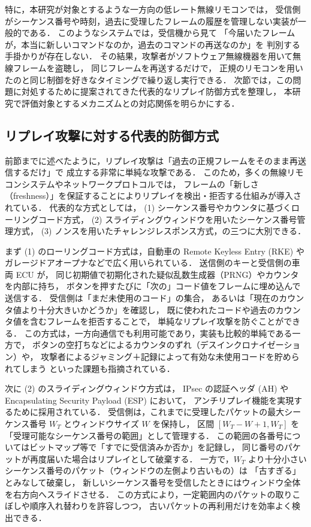 \documentclass[twocolumn,10pt,a4paper]{jsarticle}
\begin{document}
特に，本研究が対象とするような一方向の低レート無線リモコンでは，
受信側がシーケンス番号や時刻，過去に受理したフレームの履歴を管理しない実装が一般的である．
このようなシステムでは，受信機から見て
「今届いたフレームが，本当に新しいコマンドなのか，過去のコマンドの再送なのか」を
判別する手掛かりが存在しない．
その結果，攻撃者がソフトウェア無線機器を用いて無線フレームを盗聴し，
同じフレームを再送するだけで，
正規のリモコンを用いたのと同じ制御を好きなタイミングで繰り返し実行できる．
次節では，この問題に対処するために提案されてきた代表的なリプレイ防御方式を整理し，
本研究で評価対象とするメカニズムとの対応関係を明らかにする．

\subsection{リプレイ攻撃に対する代表的防御方式}

前節までに述べたように，リプレイ攻撃は「過去の正規フレームをそのまま再送信するだけ」で
成立する非常に単純な攻撃である．
このため，多くの無線リモコンシステムやネットワークプロトコルでは，
フレームの「新しさ（freshness）」を保証することによりリプレイを検出・拒否する仕組みが導入されている．
代表的な方式としては，
(1) シーケンス番号やカウンタに基づくローリングコード方式，
(2) スライディングウィンドウを用いたシーケンス番号管理方式，
(3) ノンスを用いたチャレンジレスポンス方式，の三つに大別できる．

まず (1) のローリングコード方式は，自動車の Remote Keyless Entry (RKE) や
ガレージドアオープナなどで広く用いられている\cite{Gesteira2025}．
送信側のキーと受信側の車両 ECU が，
同じ初期値で初期化された疑似乱数生成器（PRNG）やカウンタを内部に持ち，
ボタンを押すたびに「次の」コード値をフレームに埋め込んで送信する．
受信側は「まだ未使用のコード」の集合，
あるいは「現在のカウンタ値より十分大きいかどうか」を確認し，
既に使われたコードや過去のカウンタ値を含むフレームを拒否することで，
単純なリプレイ攻撃を防ぐことができる\cite{Gesteira2025}．
この方式は，一方向通信でも利用可能であり，実装も比較的単純である一方で，
ボタンの空打ちなどによるカウンタのずれ（デスインクロナイゼーション）や，
攻撃者によるジャミング＋記録によって有効な未使用コードを貯められてしまう
といった課題も指摘されている．

次に (2) のスライディングウィンドウ方式は，
IPsec の認証ヘッダ (AH) や Encapsulating Security Payload (ESP) において，
アンチリプレイ機能を実現するために採用されている\cite{rfc6479}．
受信側は，これまでに受理したパケットの最大シーケンス番号 $W_T$ とウィンドウサイズ $W$ を保持し，
区間 $[W_T-W+1, W_T]$ を「受理可能なシーケンス番号の範囲」として管理する．
この範囲の各番号についてはビットマップ等で「すでに受信済みか否か」を記録し，
同じ番号のパケットが再度届いた場合はリプレイとして破棄する\cite{rfc6479}．
一方で，$W_T$ より十分小さいシーケンス番号のパケット（ウィンドウの左側より古いもの）は
「古すぎる」とみなして破棄し，
新しいシーケンス番号を受信したときにはウィンドウ全体を右方向へスライドさせる．
この方式により，一定範囲内のパケットの取りこぼしや順序入れ替わりを許容しつつ，
古いパケットの再利用だけを効率よく検出できる．
\end{document}
